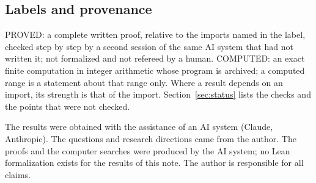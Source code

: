 \documentclass[11pt]{article}
\theoremstyle{remark}
\begin{document}
\subsection{Labels and provenance}
PROVED: a complete written proof, relative to the imports named in the label, checked step by step by a second session of the same AI system that had not written it; not formalized and not refereed by a human. COMPUTED: an exact finite computation in integer arithmetic whose program is archived; a computed range is a statement about that range only. Where a result depends on an import, its strength is that of the import. Section~\ref{sec:status} lists the checks and the points that were not checked.

The results were obtained with the assistance of an AI system (Claude, Anthropic). The questions and research directions came from the author. The proofs and the computer searches were produced by the AI system; no Lean formalization exists for the results of this note. The author is responsible for all claims.
\end{document}
